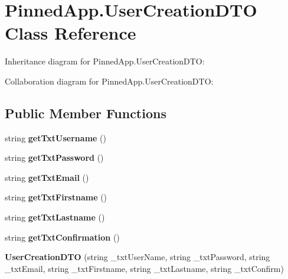 \hypertarget{class_pinned_app_1_1_user_creation_d_t_o}{}\section{Pinned\+App.\+User\+Creation\+D\+TO Class Reference}
\label{class_pinned_app_1_1_user_creation_d_t_o}


Inheritance diagram for Pinned\+App.\+User\+Creation\+D\+TO\+:


Collaboration diagram for Pinned\+App.\+User\+Creation\+D\+TO\+:
\subsection*{Public Member Functions}
\begin{DoxyCompactItemize}
\item 
\mbox{\label{class_pinned_app_1_1_user_creation_d_t_o_ab7daea37e1f32e4374c186a3e79c962d}} 
string {\bfseries get\+Txt\+Username} ()
\item 
\mbox{\label{class_pinned_app_1_1_user_creation_d_t_o_a76820be3cc14356aac654059b87338fa}} 
string {\bfseries get\+Txt\+Password} ()
\item 
\mbox{\label{class_pinned_app_1_1_user_creation_d_t_o_aa8e2a29146cc3d6ec8828ea272c8d718}} 
string {\bfseries get\+Txt\+Email} ()
\item 
\mbox{\label{class_pinned_app_1_1_user_creation_d_t_o_ad5e9206f265b1399fb8b9f8c91cf55a7}} 
string {\bfseries get\+Txt\+Firstname} ()
\item 
\mbox{\label{class_pinned_app_1_1_user_creation_d_t_o_a538b43221b2cc3ce0846f6f6781b1272}} 
string {\bfseries get\+Txt\+Lastname} ()
\item 
\mbox{\label{class_pinned_app_1_1_user_creation_d_t_o_a57c7b6db8bfae7a7158d1ccad9c5dcdd}} 
string {\bfseries get\+Txt\+Confirmation} ()
\item 
\mbox{\label{class_pinned_app_1_1_user_creation_d_t_o_a04eeb3ce70256262790b83c1ea3dc6c1}} 
{\bfseries User\+Creation\+D\+TO} (string \+\_\+txt\+User\+Name, string \+\_\+txt\+Password, string \+\_\+txt\+Email, string \+\_\+txt\+Firstname, string \+\_\+txt\+Lastname, string \+\_\+txt\+Confirm)
\end{DoxyCompactItemize}
